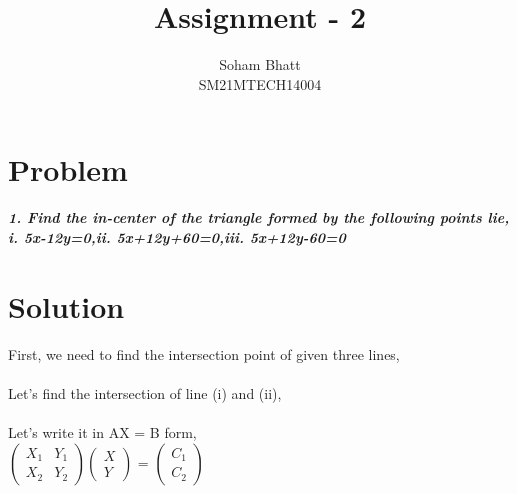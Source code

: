 \documentclass[journal,12pt,twocolumn]{IEEEtran}
\begin{document}
\newcommand{\myvec}[1]{\ensuremath{\begin{pmatrix}#1\end{pmatrix}}}
\newcommand{\cmyvec}[1]{\ensuremath{\begin{pmatrix*}[c]#1\end{pmatrix*}}}
\providecommand{\norm}[1]{\lVert#1\rVert}
\newcommand{\mydet}[1]{\ensuremath{\begin{vmatrix}#1\end{vmatrix}}}
\providecommand{\sbrak}[1]{\ensuremath{{}\left[#1\right]}}
\providecommand{\lsbrak}[1]{\ensuremath{{}\left[#1\right.}}
\providecommand{\rsbrak}[1]{\ensuremath{{}\left.#1\right]}}
\providecommand{\brak}[1]{\ensuremath{\left(#1\right)}}
\providecommand{\lbrak}[1]{\ensuremath{\left(#1\right.}}
\providecommand{\rbrak}[1]{\ensuremath{\left.#1\right)}}
\providecommand{\cbrak}[1]{\ensuremath{\left\{#1\right\}}}
\providecommand{\lcbrak}[1]{\ensuremath{\left\{#1\right.}}
\providecommand{\rcbrak}[1]{\ensuremath{\left.#1\right\}}}
\let\StandardTheFigure\thefigure
\let\vec\mathbf

\title{
Assignment - 2
}
\author{ Soham Bhatt \\SM21MTECH14004}
\maketitle
\newpage
\bigskip

\section*{\textbf{Problem}}
\noindent
\textbf{\textsl{1. Find the in-center of the triangle formed by the following points lie,}}
$$$$
\textbf{\textsl{i. 5x-12y=0,\quad ii. 5x+12y+60=0,\quad iii. 5x+12y-60=0}}
\noindent
\section*{\textbf{Solution}}
\noindent
First, we need to find the intersection point of given three lines, \\
\\
Let's find the intersection of line (i) and (ii),\\
\\
Let's write it in AX = B form,\\

\myvec{X_1&Y_1\\X_2&Y_2}\myvec{X\\Y} = \myvec{C_1\\C_2}\\
\\
\end{document}
